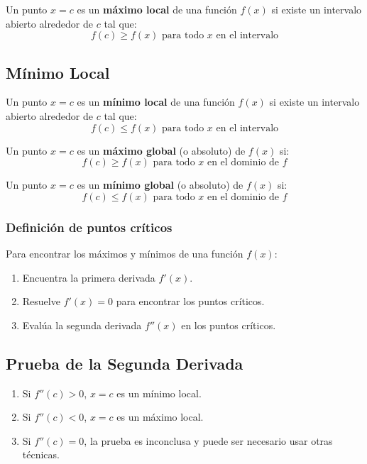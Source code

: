 \begin{definition}
    Un punto \( x = c \) es un \textbf{máximo local} de una función \( f(x) \) si existe un intervalo abierto alrededor de \( c \) tal que:
\begin{equation}
    f(c) \geq f(x) \text{ para todo } x \text{ en el intervalo}
\end{equation}

\end{definition}
\subsection*{Mínimo Local}

\begin{definition}
    Un punto \( x = c \) es un \textbf{mínimo local} de una función \( f(x) \) si existe un intervalo abierto alrededor de \( c \) tal que:
    \begin{equation}
        f(c) \leq f(x) \text{ para todo } x \text{ en el intervalo}
    \end{equation}
\end{definition}

\begin{definition}
    Un punto \( x = c \) es un \textbf{máximo global} (o absoluto) de \( f(x) \) si:
    \[
    f(c) \geq f(x) \text{ para todo } x \text{ en el dominio de } f
    \]
    
    Un punto \( x = c \) es un \textbf{mínimo global} (o absoluto) de \( f(x) \) si:
    \[
    f(c) \leq f(x) \text{ para todo } x \text{ en el dominio de } f
    \]    
\end{definition}


\subsubsection{Definición de puntos críticos}

Para encontrar los máximos y mínimos de una función \( f(x) \):
\begin{enumerate}
    \item Encuentra la primera derivada \( f'(x) \).
    \item Resuelve \( f'(x) = 0 \) para encontrar los puntos críticos.
    \item Evalúa la segunda derivada \( f''(x) \) en los puntos críticos.
\end{enumerate}

\subsection*{Prueba de la Segunda Derivada}
\begin{enumerate}
    \item Si \( f''(c) > 0 \), \( x = c \) es un mínimo local.
    \item Si \( f''(c) < 0 \), \( x = c \) es un máximo local.
    \item Si \( f''(c) = 0 \), la prueba es inconclusa y puede ser necesario usar otras técnicas.
\end{enumerate}


